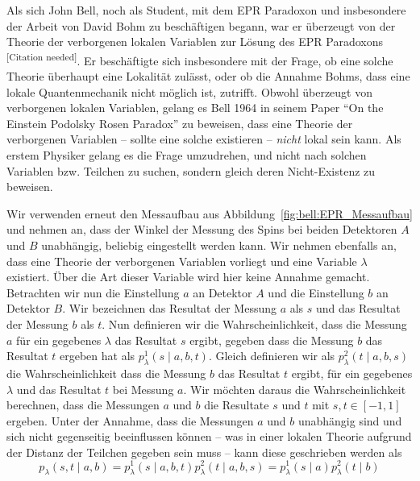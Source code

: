 \begin{refsection}
Als sich John Bell, noch als Student, mit dem EPR Paradoxon und insbesondere
der Arbeit von David Bohm zu besch\"aftigen begann, war er \"uberzeugt von
der Theorie der verborgenen lokalen Variablen zur L\"osung des EPR Paradoxons
\textsuperscript{[Citation needed]}.
Er besch\"aftigte sich insbesondere mit der Frage, ob eine solche Theorie
\"uberhaupt eine Lokalit\"at zul\"asst, oder ob die Annahme Bohms,
dass eine lokale Quantenmechanik nicht m\"oglich ist, zutrifft.
Obwohl \"uberzeugt von verborgenen lokalen Variablen, gelang es Bell 1964
in seinem Paper 
\enquote{On the Einstein Podolsky Rosen Paradox} \cite{Bell:Bell1964}
zu beweisen, dass eine Theorie der verborgenen Variablen -- sollte eine
solche existieren -- \emph{nicht} lokal sein kann.
Als erstem Physiker gelang es die Frage umzudrehen, und nicht nach solchen
Variablen bzw. Teilchen zu suchen, sondern gleich deren Nicht-Existenz
zu beweisen.

Wir verwenden erneut den Messaufbau aus Abbildung~\ref{fig:bell:EPR_Messaufbau}
und nehmen an, dass der Winkel der Messung des Spins bei beiden Detektoren 
$A$ und $B$ unabh\"angig, beliebig eingestellt werden kann.
Wir nehmen ebenfalls an, dass eine Theorie der verborgenen Variablen vorliegt
und eine Variable $\lambda$ existiert.
\"Uber die Art dieser Variable wird hier keine Annahme gemacht.
Betrachten wir nun die Einstellung $a$ an Detektor $A$ und die Einstellung
$b$ an Detektor $B$.
Wir bezeichnen das Resultat der Messung $a$ als $s$ und das Resultat
der Messung $b$ als $t$.
Nun definieren wir die Wahrscheinlichkeit, dass die Messung $a$ f\"ur ein
gegebenes $\lambda$ das Resultat $s$ ergibt, gegeben dass die Messung $b$ das
Resultat $t$ ergeben hat als $p_{\lambda}^1(s \mid a,b,t)$.
Gleich definieren wir als $p_{\lambda}^2(t \mid a,b,s)$ die Wahrscheinlichkeit
dass die Messung $b$ das Resultat $t$ ergibt, f\"ur ein gegebenes $\lambda$ und
das Resultat $t$ bei Messung $a$. 
Wir m\"ochten daraus die Wahrscheinlichkeit berechnen, dass die Messungen
$a$ und $b$ die Resultate $s$ und $t$ mit $s,t \in [-1,1]$ ergeben. 
Unter der Annahme, dass die Messungen $a$ und $b$ unabh\"angig sind und sich
nicht gegenseitig beeinflussen k\"onnen -- was in einer lokalen Theorie
aufgrund der Distanz der Teilchen gegeben sein muss -- kann diese geschrieben
werden als
\begin{equation}
    p_{\lambda}(s,t \mid a,b) 
    = p_{\lambda}^1(s \mid a,b,t) p_{\lambda}^2(t \mid a,b,s)
    = p_{\lambda}^1(s \mid a) p_{\lambda}^2(t \mid b)
    \label{equ:bell:wkeit}
\end{equation}


\end{refsection}
